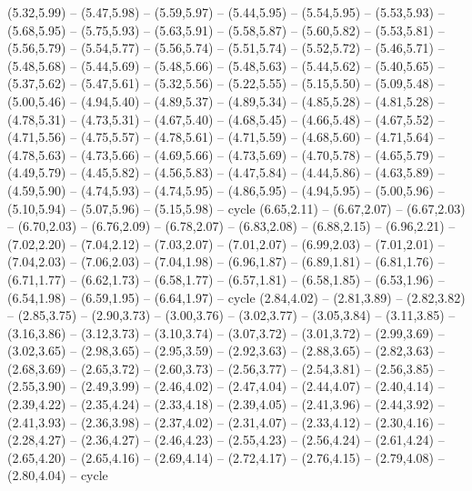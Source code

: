 \expandafter\def\csname geo:gebiet:GRL\endcsname{
  (5.32,5.99) -- (5.47,5.98) -- (5.59,5.97) -- (5.44,5.95) -- (5.54,5.95) -- (5.53,5.93) -- (5.68,5.95) -- (5.75,5.93) -- (5.63,5.91) -- (5.58,5.87) -- (5.60,5.82) -- (5.53,5.81) -- (5.56,5.79) -- (5.54,5.77) -- (5.56,5.74) -- (5.51,5.74) -- (5.52,5.72) -- (5.46,5.71) -- (5.48,5.68) -- (5.44,5.69) -- (5.48,5.66) -- (5.48,5.63) -- (5.44,5.62) -- (5.40,5.65) -- (5.37,5.62) -- (5.47,5.61) -- (5.32,5.56) -- (5.22,5.55) -- (5.15,5.50) -- (5.09,5.48) -- (5.00,5.46) -- (4.94,5.40) -- (4.89,5.37) -- (4.89,5.34) -- (4.85,5.28) -- (4.81,5.28) -- (4.78,5.31) -- (4.73,5.31) -- (4.67,5.40) -- (4.68,5.45) -- (4.66,5.48) -- (4.67,5.52) -- (4.71,5.56) -- (4.75,5.57) -- (4.78,5.61) -- (4.71,5.59) -- (4.68,5.60) -- (4.71,5.64) -- (4.78,5.63) -- (4.73,5.66) -- (4.69,5.66) -- (4.73,5.69) -- (4.70,5.78) -- (4.65,5.79) -- (4.49,5.79) -- (4.45,5.82) -- (4.56,5.83) -- (4.47,5.84) -- (4.44,5.86) -- (4.63,5.89) -- (4.59,5.90) -- (4.74,5.93) -- (4.74,5.95) -- (4.86,5.95) -- (4.94,5.95) -- (5.00,5.96) -- (5.10,5.94) -- (5.07,5.96) -- (5.15,5.98) -- cycle}
\expandafter\def\csname geo:gebiet:ATF\endcsname{
  }
\expandafter\def\csname geo:gebiet:TLS\endcsname{
  }
\expandafter\def\csname geo:gebiet:ZAF\endcsname{
  (6.65,2.11) -- (6.67,2.07) -- (6.67,2.03) -- (6.70,2.03) -- (6.76,2.09) -- (6.78,2.07) -- (6.83,2.08) -- (6.88,2.15) -- (6.96,2.21) -- (7.02,2.20) -- (7.04,2.12) -- (7.03,2.07) -- (7.01,2.07) -- (6.99,2.03) -- (7.01,2.01) -- (7.04,2.03) -- (7.06,2.03) -- (7.04,1.98) -- (6.96,1.87) -- (6.89,1.81) -- (6.81,1.76) -- (6.71,1.77) -- (6.62,1.73) -- (6.58,1.77) -- (6.57,1.81) -- (6.58,1.85) -- (6.53,1.96) -- (6.54,1.98) -- (6.59,1.95) -- (6.64,1.97) -- cycle}
\expandafter\def\csname geo:gebiet:LSO\endcsname{
  }
\expandafter\def\csname geo:gebiet:MEX\endcsname{
  (2.84,4.02) -- (2.81,3.89) -- (2.82,3.82) -- (2.85,3.75) -- (2.90,3.73) -- (3.00,3.76) -- (3.02,3.77) -- (3.05,3.84) -- (3.11,3.85) -- (3.16,3.86) -- (3.12,3.73) -- (3.10,3.74) -- (3.07,3.72) -- (3.01,3.72) -- (2.99,3.69) -- (3.02,3.65) -- (2.98,3.65) -- (2.95,3.59) -- (2.92,3.63) -- (2.88,3.65) -- (2.82,3.63) -- (2.68,3.69) -- (2.65,3.72) -- (2.60,3.73) -- (2.56,3.77) -- (2.54,3.81) -- (2.56,3.85) -- (2.55,3.90) -- (2.49,3.99) -- (2.46,4.02) -- (2.47,4.04) -- (2.44,4.07) -- (2.40,4.14) -- (2.39,4.22) -- (2.35,4.24) -- (2.33,4.18) -- (2.39,4.05) -- (2.41,3.96) -- (2.44,3.92) -- (2.41,3.93) -- (2.36,3.98) -- (2.37,4.02) -- (2.31,4.07) -- (2.33,4.12) -- (2.30,4.16) -- (2.28,4.27) -- (2.36,4.27) -- (2.46,4.23) -- (2.55,4.23) -- (2.56,4.24) -- (2.61,4.24) -- (2.65,4.20) -- (2.65,4.16) -- (2.69,4.14) -- (2.72,4.17) -- (2.76,4.15) -- (2.79,4.08) -- (2.80,4.04) -- cycle}
